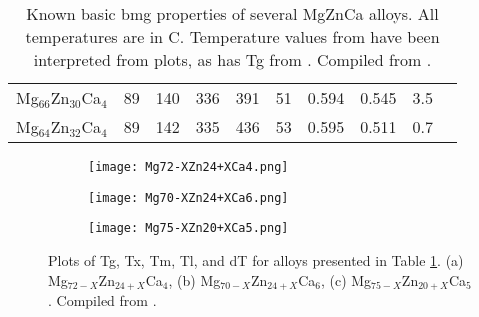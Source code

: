 \documentclass[a4paper,12pt,oneside]{report}%
\begin{document}
\begin{table}[h]
\begin{tabular}{ l l l l l l l l l l }
		Mg$_{66}$Zn$_{30}$Ca$_{4}$ & 89 & 140 & 336 & 391 & 51 & 0.594 & 0.545 & 3.5 & \cite{Cao2013, Cao2012} \\ 
		Mg$_{64}$Zn$_{32}$Ca$_{4}$ & 89 & 142 & 335 & 436 & 53 & 0.595 & 0.511 & 0.7 & \cite{Cao2013, Cao2012} \\
		\bottomrule 
	\end{tabular}
	\caption[Known basic \acrshort{bmg} properties of several MgZnCa alloys. All temperatures are in \degree C.]{Known basic \acrshort{bmg} properties of several MgZnCa alloys. All temperatures are in \degree C. Temperature values from \cite{Gu2005} have been interpreted from plots, as has \acrshort{Tg} from \cite{Wang2013}. Compiled from \cite{Cao2013, Gu2005, Zhou2013, Cao2012, Wang2013}.}
	\label{tab:MgZnCaAlloys}
\end{table}

\begin{figure}[htb]
	\centering
	\begin{subfigure}[htbp]{0.49\textwidth}
		\texttt{[image: Mg72-XZn24+XCa4.png]}
		\caption{}
		\label{fig:Mg72xZn24xCa4}
	\end{subfigure}
	\begin{subfigure}[htbp]{0.49\textwidth}
		\texttt{[image: Mg70-XZn24+XCa6.png]}
		\caption{}
		\label{fig:Mg70xZn24xCa6}
	\end{subfigure}
	\begin{subfigure}[htbp]{0.49\textwidth}
		\texttt{[image: Mg75-XZn20+XCa5.png]}
		\caption{}
		\label{fig:Mg75xZn20xCa5}
	\end{subfigure}
	\caption[Plots of \acrshort{Tg}, \acrshort{Tx}, \acrshort{Tm}, \acrshort{Tl}, and \acrshort{dT} for alloys presented in Table \ref{tab:MgZnCaAlloys}. (a) Mg$_{72-X}$Zn$_{24+X}$Ca$_{4}$, (b) Mg$_{70-X}$Zn$_{24+X}$Ca$_{6}$, (c) Mg$_{75-X}$Zn$_{20+X}$Ca$_{5}$.]{Plots of \acrshort{Tg}, \acrshort{Tx}, \acrshort{Tm}, \acrshort{Tl}, and \acrshort{dT} for alloys presented in Table \ref{tab:MgZnCaAlloys}. (a) Mg$_{72-X}$Zn$_{24+X}$Ca$_{4}$, (b) Mg$_{70-X}$Zn$_{24+X}$Ca$_{6}$, (c) Mg$_{75-X}$Zn$_{20+X}$Ca$_{5}$. Compiled from \cite{Cao2013, Gu2005, Zhou2013, Cao2012, Wang2013}.}%
	\label{fig:MgZnCaPlots}
\end{figure}

\newpage


\printglossaries
\end{document}
